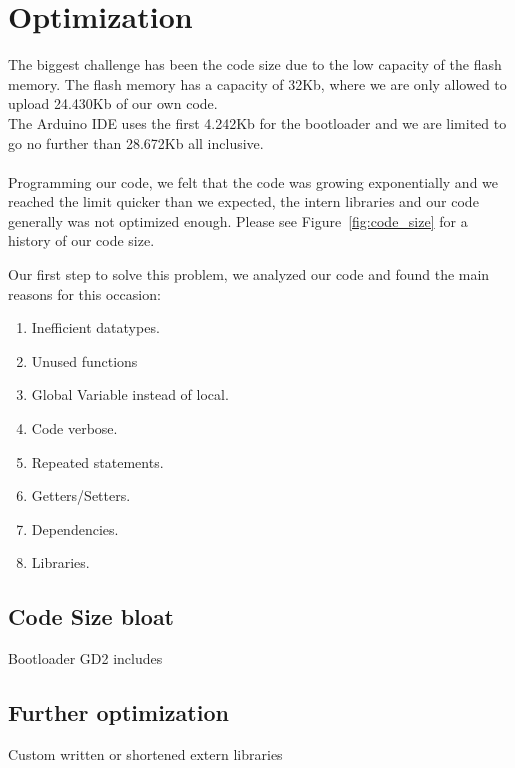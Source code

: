 \section{Optimization}%
The biggest challenge has been the code size due to the low capacity of the flash memory.
The flash memory has a capacity of 32Kb, where we are only allowed to upload 24.430Kb
of our own code. \\
The Arduino IDE uses the first 4.242Kb for the
bootloader and we are limited to go no further than 28.672Kb all inclusive.
\\
\\
Programming our code, we felt
that the code was growing exponentially and we reached the limit quicker than
we expected, the intern libraries and our code generally was not optimized enough. Please
see Figure~\ref{fig:code_size} for a history of our code size.

Our first step to solve this problem, we analyzed our code and found the main
reasons for this occasion:

\begin{enumerate}
\item Inefficient datatypes.
\item Unused functions
\item Global Variable instead of local.
\item Code verbose.
\item Repeated statements.
\item Getters/Setters.
\item Dependencies.
\item Libraries.
\end{enumerate}

\subsection{Code Size bloat}
Bootloader
GD2
includes
\subsection{Further optimization}
Custom written or shortened extern libraries

